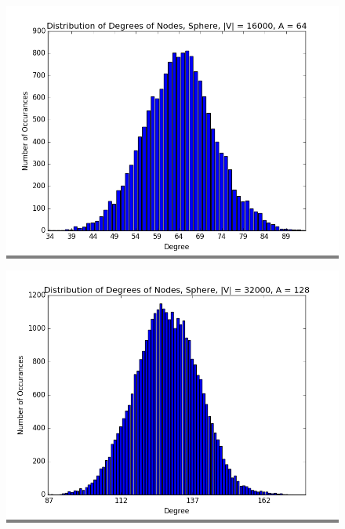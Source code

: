 \documentclass{article}
\begin{document}
\begin{figure}
    \begin{minipage}{0.45\textwidth}
    \colorbox{gray}{\includegraphics[width=\linewidth]{./graphs/hist_deg_sphere_0.png}}
    \end{minipage}
    \hspace{\fill}
    \begin{minipage}{0.45\textwidth}
    \colorbox{gray}{\includegraphics[width=\linewidth]{./graphs/hist_deg_sphere_1.png}}
    \end{minipage}
    \vskip 0.25in
    \begin{minipage}{0.45\textwidth}

\end{minipage}
\end{figure}
\end{document}

